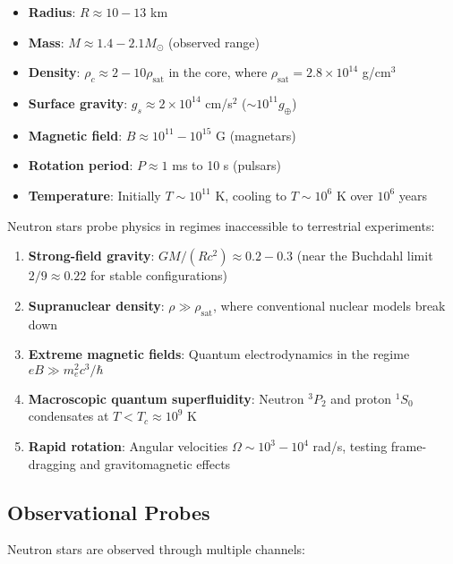 \documentclass[12pt,a4paper]{article}
\theoremstyle{definition}
\theoremstyle{remark}
\begin{document}
\begin{itemize}[leftmargin=*]
\item \textbf{Radius}: $R \approx 10-13$ km
\item \textbf{Mass}: $M \approx 1.4-2.1 M_\odot$ (observed range)
\item \textbf{Density}: $\rho_c \approx 2-10 \rho_{\text{sat}}$ in the core, where $\rho_{\text{sat}} = 2.8 \times 10^{14}$ g/cm$^3$
\item \textbf{Surface gravity}: $g_s \approx 2 \times 10^{14}$ cm/s$^2$ ($\sim 10^{11} g_{\oplus}$)
\item \textbf{Magnetic field}: $B \approx 10^{11}-10^{15}$ G (magnetars)
\item \textbf{Rotation period}: $P \approx 1$ ms to 10 s (pulsars)
\item \textbf{Temperature}: Initially $T \sim 10^{11}$ K, cooling to $T \sim 10^6$ K over $10^6$ years
\end{itemize}

Neutron stars probe physics in regimes inaccessible to terrestrial experiments:
\begin{enumerate}
\item \textbf{Strong-field gravity}: $GM/(Rc^2) \approx 0.2-0.3$ (near the Buchdahl limit $2/9 \approx 0.22$ for stable configurations)
\item \textbf{Supranuclear density}: $\rho \gg \rho_{\text{sat}}$, where conventional nuclear models break down
\item \textbf{Extreme magnetic fields}: Quantum electrodynamics in the regime $eB \gg m_e^2 c^3/\hbar$
\item \textbf{Macroscopic quantum superfluidity}: Neutron $^3P_2$ and proton $^1S_0$ condensates at $T < T_c \approx 10^9$ K
\item \textbf{Rapid rotation}: Angular velocities $\Omega \sim 10^3-10^4$ rad/s, testing frame-dragging and gravitomagnetic effects
\end{enumerate}

\subsection{Observational Probes}

Neutron stars are observed through multiple channels:
\end{document}
